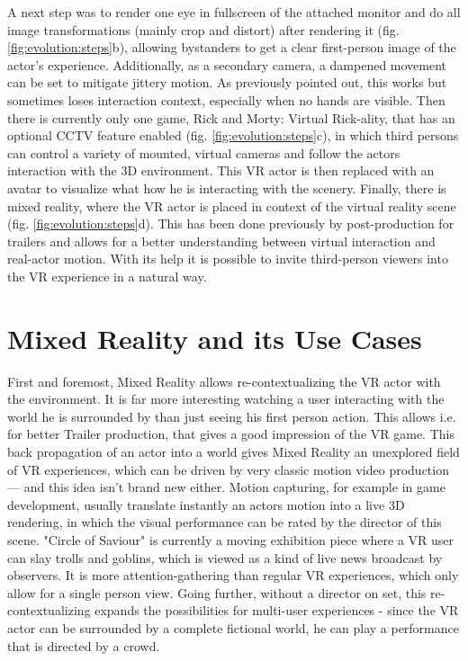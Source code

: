 A next step was to render one eye in fullscreen of the attached monitor and do 
all image transformations (mainly crop and distort) after rendering it (fig. 
\ref{fig:evolution:steps}b), allowing bystanders to get a clear first-person 
image of the actor's experience. Additionally, as a secondary camera, a 
dampened movement can be set to mitigate jittery motion. As previously pointed 
out, this works but sometimes loses interaction context, especially when no 
hands are visible. 
\newline
Then there is currently only one game, Rick and Morty: Virtual Rick-ality, that 
has an optional CCTV feature enabled (fig. \ref{fig:evolution:steps}c), in 
which third persons can control a variety of mounted, virtual cameras and 
follow the actors interaction with the 3D environment. This VR actor is then 
replaced with an avatar to visualize what how he is interacting with the 
scenery.
\newline
Finally, there is mixed reality, where the VR actor is placed in context of 
the virtual reality scene (fig. \ref{fig:evolution:steps}d). This has been done 
previously by post-production for trailers and allows for a better 
understanding between virtual interaction and real-actor motion. With its help 
it is possible to invite third-person viewers into the VR experience in a 
natural way.

\section{Mixed Reality and its Use Cases}

First and foremost, Mixed Reality allows re-contextualizing the VR actor with 
the environment. It is far more interesting watching a user interacting with 
the world he is surrounded by than just seeing his first person action. This 
allows i.e. for better Trailer production, that gives a good impression of the 
VR game.
\newline
This back propagation of an actor into a world gives Mixed Reality an 
unexplored field of VR experiences, which can be driven by very classic motion 
video production --- and this idea isn't brand new either. Motion capturing, 
for example in game development, usually translate instantly an actors motion 
into a live 3D rendering, in which the visual performance can be rated by the 
director of this scene.
\newline
"Circle of Saviour" is currently a moving exhibition piece where a VR user can 
slay trolls and goblins, which is viewed as a kind of live news broadcast by 
observers. It is more attention-gathering than regular VR experiences, which 
only allow for a single person view. 
\newline
Going further, without a director on set, this re-contextualizing expands the 
possibilities for multi-user experiences - since the VR actor can be surrounded 
by a complete fictional world, he can play a performance that is directed by a 
crowd.

